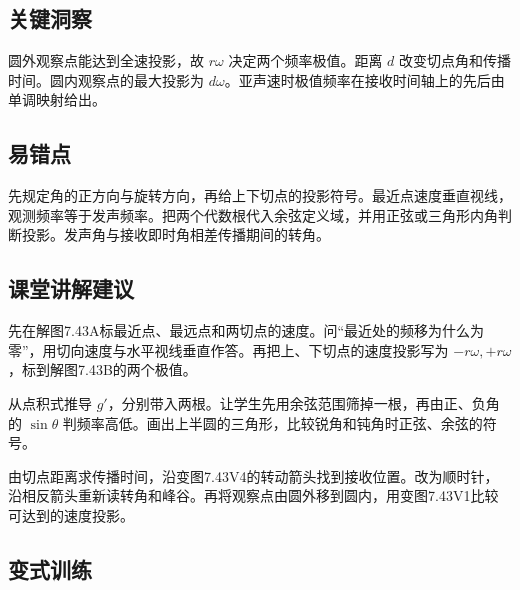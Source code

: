 \documentclass[UTF8,fontset=fandol,a4paper,11pt]{ctexart}
\begin{document}


\subsection*{关键洞察}

圆外观察点能达到全速投影，故 $r\omega$ 决定两个频率极值。距离 $d$ 改变切点角和传播时间。圆内观察点的最大投影为 $d\omega$。亚声速时极值频率在接收时间轴上的先后由单调映射给出。




\subsection*{易错点}

先规定角的正方向与旋转方向，再给上下切点的投影符号。最近点速度垂直视线，观测频率等于发声频率。把两个代数根代入余弦定义域，并用正弦或三角形内角判断投影。发声角与接收即时角相差传播期间的转角。




\subsection*{课堂讲解建议}

先在解图7.43A标最近点、最远点和两切点的速度。问“最近处的频移为什么为零”，用切向速度与水平视线垂直作答。再把上、下切点的速度投影写为 $-r\omega,+r\omega$，标到解图7.43B的两个极值。

从点积式推导 $g'$，分别带入两根。让学生先用余弦范围筛掉一根，再由正、负角的 $\sin\theta$ 判频率高低。画出上半圆的三角形，比较锐角和钝角时正弦、余弦的符号。

由切点距离求传播时间，沿变图7.43V4的转动箭头找到接收位置。改为顺时针，沿相反箭头重新读转角和峰谷。再将观察点由圆外移到圆内，用变图7.43V1比较可达到的速度投影。




\subsection*{变式训练}
\end{document}
